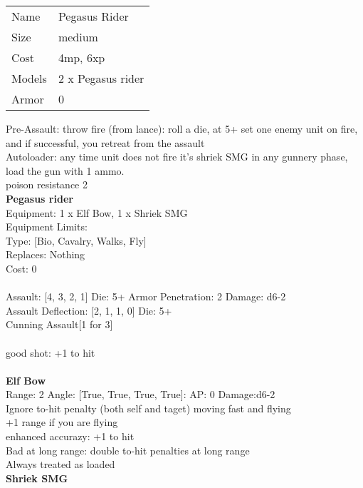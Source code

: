 \begin{tabular}{ll}
  Name & Pegasus Rider \\
  Size & medium\\
  Cost & 4mp, 6xp\\
  Models & 2 x Pegasus rider\\
  Armor & 0\\
\end{tabular}

\noindent Pre-Assault: throw fire (from lance): roll a die, at 5+ set one enemy unit on fire, and if successful, you retreat from the assault\\ 
Autoloader: any time unit does not fire it's shriek SMG in any gunnery phase, load the gun with 1 ammo.\\ 
poison resistance 2\\ 


{\bf Pegasus rider } \\
Equipment: 1 x Elf Bow, 1 x Shriek SMG \\
Equipment Limits:  \\
Type: [Bio, Cavalry, Walks, Fly] \\
Replaces: Nothing \\
Cost: 0\\
\ \\
Assault: [4, 3, 2, 1] Die: 5+ Armor Penetration: 2 Damage: d6-2 \\
Assault Deflection: [2, 1, 1, 0] Die: 5+\\
\indent Cunning Assault[1 for 3]\\ 
 
\ \\
good shot: +1 to hit\\ 

\ \\
{\bf Elf Bow } \\



Range: 2  Angle: [True, True, True, True]: AP: 0 Damage:d6-2 \\
Ignore to-hit penalty (both self and taget) moving fast and flying\\ 
+1 range if you are flying\\ 
enhanced accurazy: +1 to hit\\ 
Bad at long range: double to-hit penalties at long range\\ 
Always treated as loaded\\ 




{\bf Shriek SMG } \\



